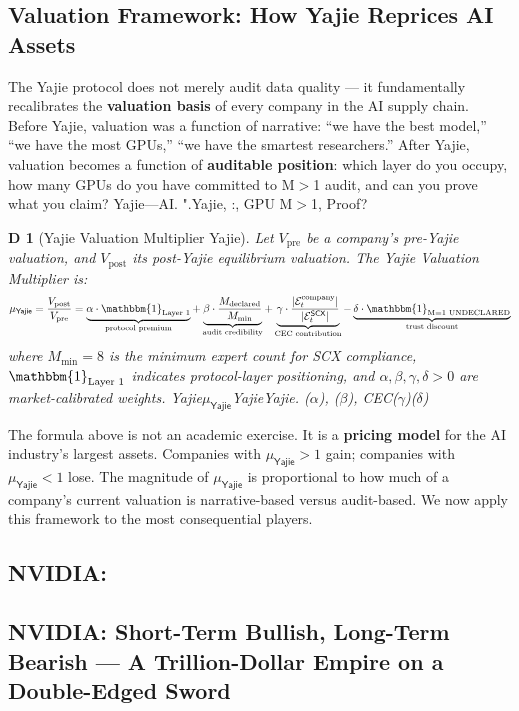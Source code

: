 \documentclass[12pt,a4paper]{article}
\newtheorem{definition}[theorem]Definition
\theoremstyle{remark}
\newcommand{\SCX}{\textsf{SCX}}
\newcommand{\Yajie}{\textsf{Yajie}}
\begin{document}
\subsection{Valuation Framework: How Yajie Reprices AI Assets}
The Yajie protocol does not merely audit data quality --- it fundamentally
recalibrates the \textbf{valuation basis} of every company in the AI supply
chain. Before Yajie, valuation was a function of narrative: ``we have the
best model,'' ``we have the most GPUs,'' ``we have the smartest researchers.''
After Yajie, valuation becomes a function of \textbf{auditable position}: 
which layer do you occupy, how many GPUs do you have committed to M$>$1 
audit, and can you prove what you claim?
\medskip
Yajie---AI.
".Yajie, :, GPU
M$>$1, Proof?
\begin{definition}[Yajie Valuation Multiplier Yajie]
Let $V_{\text{pre}}$ be a company's pre-Yajie valuation, and $V_{\text{post}}$ 
its post-Yajie equilibrium valuation. The Yajie Valuation Multiplier is:
\begin{equation}
\mu_{\Yajie} = \frac{V_{\text{post}}}{V_{\text{pre}}} 
= \underbrace{\alpha \cdot \mathbbm{1}_{\text{Layer 1}}}_{\text{protocol premium}}
+ \underbrace{\beta \cdot \frac{M_{\text{declared}}}{M_{\min}}}_{\text{audit credibility}}
+ \underbrace{\gamma \cdot \frac{|\mathcal{E}_t^{\text{company}}|}{|\mathcal{E}_t^{\SCX}|}}_{\text{CEC contribution}}
- \underbrace{\delta \cdot \mathbbm{1}_{\text{M=1 UNDECLARED}}}_{\text{trust discount}}
\end{equation}
where $M_{\min}=8$ is the minimum expert count for SCX compliance, 
$\mathbbm{1}_{\text{Layer 1}}$ indicates protocol-layer positioning,
and $\alpha, \beta, \gamma, \delta > 0$ are market-calibrated weights.
\small Yajie$\mu_{\Yajie}$YajieYajie.
($\alpha$), ($\beta$), CEC($\gamma$)($\delta$)
\end{definition}
The formula above is not an academic exercise. It is a \textbf{pricing model} 
for the AI industry's largest assets. Companies with $\mu_{\Yajie} > 1$ gain; 
companies with $\mu_{\Yajie} < 1$ lose. The magnitude of $\mu_{\Yajie}$ is 
proportional to how much of a company's current valuation is narrative-based 
versus audit-based. We now apply this framework to the most consequential 
players.
\subsection{NVIDIA:}
\subsection{NVIDIA: Short-Term Bullish, Long-Term Bearish --- A Trillion-Dollar Empire on a Double-Edged Sword}
\end{document}
